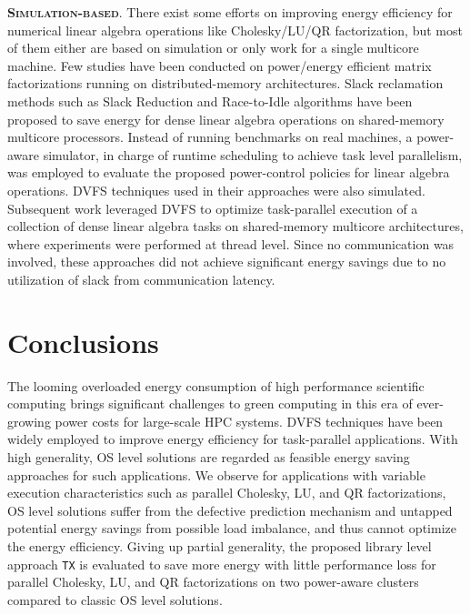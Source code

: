 \documentclass[12pt]{elsarticle}
\begin{document}
\vspace{1mm}
\noindent\textsc{\textbf{Simulation-based}}. There exist some efforts on improving energy efficiency for numerical linear algebra operations like Cholesky/LU/QR factorization, but most of them either are based on simulation or only work for a single multicore machine. Few studies have been conducted on power/energy efficient matrix factorizations running on distributed-memory architectures. Slack reclamation methods such as Slack Reduction and Race-to-Idle algorithms \cite{csrd12a} \cite{hpcs11} have been proposed to save energy for dense linear algebra operations on shared-memory multicore processors. Instead of running benchmarks on real machines, a power-aware simulator, in charge of runtime scheduling to achieve task level parallelism, was employed to evaluate the proposed power-control policies for linear algebra operations. DVFS techniques used in their approaches were also simulated. Subsequent work \cite{pdp12a} leveraged DVFS to optimize task-parallel execution of a collection of dense linear algebra tasks on shared-memory multicore architectures, where experiments were performed at thread level. Since no communication was involved, these approaches did not achieve significant energy savings due to no utilization of slack from communication latency.








\section{Conclusions}

The looming overloaded energy consumption of high performance scientific computing brings significant challenges to green computing in this era of ever-growing power costs for large-scale HPC systems. DVFS techniques have been widely employed to improve energy efficiency for task-parallel applications. With high generality, OS level solutions are regarded as feasible energy saving approaches for such applications. We observe for applications with variable execution characteristics such as parallel Cholesky, LU, and QR factorizations, OS level solutions suffer from the defective prediction mechanism and untapped potential energy savings from possible load imbalance, and thus cannot optimize the energy efficiency. Giving up partial generality, the proposed library level approach \texttt{TX} is evaluated to save more energy with little performance loss for parallel Cholesky, LU, and QR factorizations on two power-aware clusters compared to classic OS level solutions.









\end{document}
